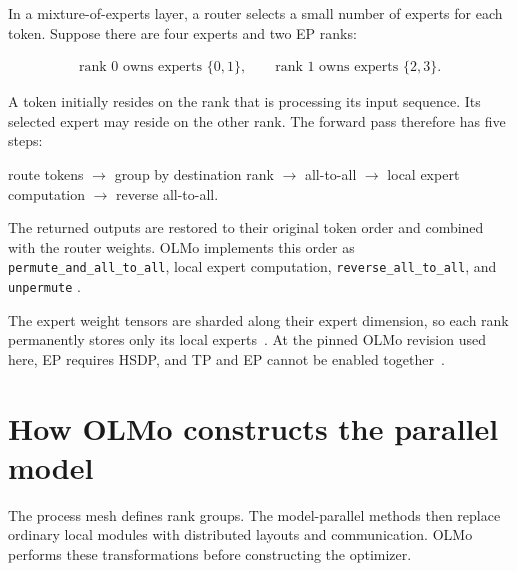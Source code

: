 \documentclass[11pt]{article}
\begin{document}
In a mixture-of-experts layer, a router selects a small number of experts for
each token. Suppose there are four experts and two EP ranks:

\begin{equation}
\begin{split}
\text{rank 0 owns experts }\{0,1\},\qquad
\text{rank 1 owns experts }\{2,3\}.
\end{split}
\end{equation}

A token initially resides on the rank that is processing its input sequence.
Its selected expert may reside on the other rank. The forward pass therefore
has five steps:

\begin{center}
route tokens
\(\longrightarrow\) group by destination rank
\(\longrightarrow\) all-to-all
\(\longrightarrow\) local expert computation
\(\longrightarrow\) reverse all-to-all.
\end{center}

The returned outputs are restored to their original token order and combined
with the router weights. OLMo implements this order as
\texttt{permute\_and\_all\_to\_all}, local expert computation,
\texttt{reverse\_all\_to\_all}, and \texttt{unpermute}
\cite{olmo-parallel-mlp}.

The expert weight tensors are sharded along their expert dimension, so each
rank permanently stores only its local experts~\cite{olmo-expert-mlp}. At the
pinned OLMo revision used here, EP requires HSDP, and TP and EP cannot be
enabled together~\cite{olmo-world-mesh,olmo-parallelize-model}.

\newpage
\section{How OLMo constructs the parallel model}

The process mesh defines rank groups. The model-parallel methods then replace
ordinary local modules with distributed layouts and communication. OLMo
performs these transformations before constructing the optimizer.
\end{document}
